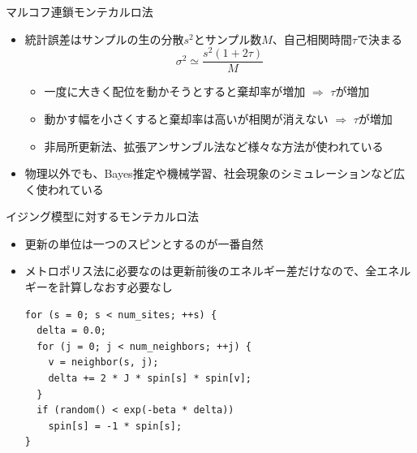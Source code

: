 \begin{frame}[t,fragile]{マルコフ連鎖モンテカルロ法}
  \begin{itemize}
  \item 統計誤差はサンプルの生の分散$s^2$とサンプル数$M$、自己相関時間$\tau$で決まる
    \[
    \sigma^2 \simeq \frac{s^2 (1+2\tau)}{M}
    \]
    \begin{itemize}
    \item 一度に大きく配位を動かそうとすると棄却率が増加 $\Rightarrow$ $\tau$が増加
    \item 動かす幅を小さくすると棄却率は高いが相関が消えない $\Rightarrow$ $\tau$が増加
    \item 非局所更新法、拡張アンサンブル法など様々な方法が使われている
    \end{itemize}
  \item 物理以外でも、Bayes推定や機械学習、社会現象のシミュレーションなど広く使われている
  \end{itemize}
\end{frame}

\begin{frame}[t,fragile]{イジング模型に対するモンテカルロ法}
  \begin{itemize}
  \item 更新の単位は一つのスピンとするのが一番自然
  \item メトロポリス法に必要なのは更新前後のエネルギー差だけなので、全エネルギーを計算しなおす必要なし
\begin{verbatim}
for (s = 0; s < num_sites; ++s) {
  delta = 0.0;
  for (j = 0; j < num_neighbors; ++j) {
    v = neighbor(s, j);
    delta += 2 * J * spin[s] * spin[v];
  }
  if (random() < exp(-beta * delta))
    spin[s] = -1 * spin[s];
}  
\end{verbatim}
  \end{itemize}
\end{frame}

